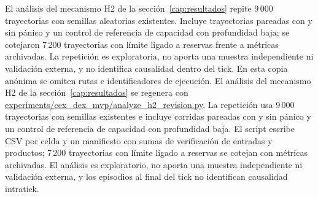 \ifdefined\blindreviewmode
El análisis del mecanismo H2 de la sección~\ref{cap:resultados} repite 9\,000 trayectorias con semillas aleatorias existentes. Incluye trayectorias pareadas con y sin pánico y un control de referencia de capacidad con profundidad baja; se cotejaron 7\,200 trayectorias con límite ligado a reservas frente a métricas archivadas. La repetición es exploratoria, no aporta una muestra independiente ni validación externa, y no identifica causalidad dentro del tick. En esta copia anónima se omiten rutas e identificadores de ejecución.
\else
El análisis del mecanismo H2 de la sección~\ref{cap:resultados} se regenera con  \url{experiments/cex_dex_mvp/analyze_h2_revision.py}. La repetición \code{\HtwoReviewRunID} usa 9\,000 trayectorias con semillas existentes e incluye corridas pareadas con y sin pánico y un control de referencia de capacidad con profundidad baja. El script escribe CSV por celda y un manifiesto con sumas de verificación de entradas y productos; 7\,200 trayectorias con límite ligado a reservas se cotejan con métricas archivadas. El análisis es exploratorio, no aporta una muestra independiente ni validación externa, y los episodios al final del tick no identifican causalidad intratick.
\fi
